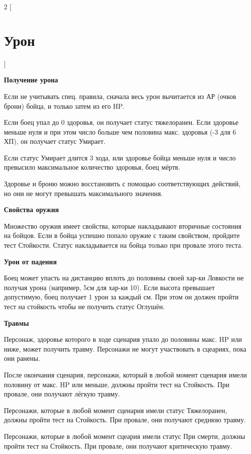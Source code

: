 \begin{multicols}{2}
    [
    \section{Урон}
    ]    

    \textbf{Получение урона}

    Если не учитывать спец. правила, сначала весь урон вычитается из АР (очков брони) бойца, и только затем из его HP. 

    Если боец упал до 0 здоровья, он получает статус тяжелоранен. Если здоровье меньше нуля 
    и при этом число больше чем половина макс. здоровья (-3 для 6 ХП), он получает статус Умирает.

    Если статус Умирает длится 3 хода, или здоровье бойца меньше нуля и число превысило максимальное количество здоровья, боец мёртв.
    
    Здоровье и броню можно восстановить с помощью соответствующих действий, но они не могут превышать максимального значения.

    \textbf{Свойства оружия}

    Множество оружия имеет свойства, которые накладывают вторичные состояния на бойцов. Если в бойца успешно попало оружие с таким свойством, пройдите 
    тест Стойкости. Статус накладывается на бойца только при провале этого теста.

    \textbf{Урон от падения}

    Боец может упасть на дистанцию вплоть до половины своей хар-ки Ловкости не получая урона (например, 5см для хар-ки 10). Если высота
    превышает допустимую, боец получает 1 урон за каждый см. При этом он должен пройти тест на стойкость чтобы не получить статус Оглушён.

    \textbf{Травмы}

    Персонаж, здоровье которого в ходе сценария упало до половины макс. HP или ниже, может получить травму. Персонажи не могут участвовать в сцеариях, пока они ранены. 
    
    После окончания сценария, персонажи, который в любой момент сценария имели половину от макс. HP или меньше, должны пройти тест на Стойкость. При провале, они получают лёгкую травму.
    
    Персонажи, которые в любой момент сценария имели статус Тяжелоранен, должны пройти тест на Стойкость. При провале, они получают среднюю травму.

    Персонажи, которые в любой момент сцеария имели статус При смерти, должны пройти тест на Стойкость. При провале, они получают критическую травму.


\end{multicols}
